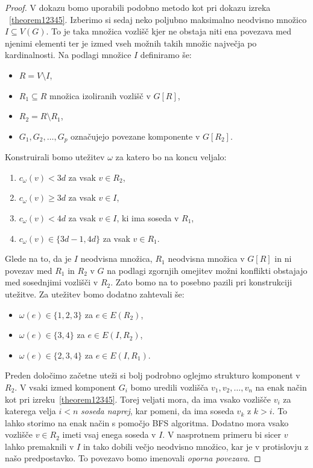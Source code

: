 \documentclass[12pt,a4paper,twoside]{article}
\theoremstyle{definition} %
\theoremstyle{plain} %
\numberwithin{equation}{section}  %
\begin{document}
\begin{proof}
V dokazu bomo uporabili podobno metodo kot pri dokazu izreka ~\ref{theorem12345}. Izberimo si sedaj neko poljubno maksimalno neodvisno množico $ I \subseteq V(G)$. To je taka množica vozlišč kjer ne obstaja niti ena povezava med njenimi elementi ter je izmed vseh možnih takih množic največja po kardinalnosti. Na podlagi množice $I$ definiramo še:
\begin{itemize}
\item $R = V \setminus I$,
\item $R_1 \subseteq R$ množica izoliranih vozlišč v $G[R]$,
\item $R_2 = R \setminus R_1$,
\item $G_1, G_2, \ldots, G_p$ označujejo povezane komponente v $G[R_2]$.
\end{itemize}
Konstruirali bomo utežitev $\omega$ za katero bo na koncu veljalo:
\begin{enumerate}
\item \label{itm:1} $c_{\omega}(v) < 3d $ za vsak $v \in R_2$,
\item \label{itm:2}$c_{\omega}(v) \ge 3d $ za vsak $v \in I$,
\item \label{itm:3}$c_{\omega}(v) < 4d $ za vsak $v \in I$, ki ima soseda v $R_1$,
\item \label{itm:4}$c_{\omega}(v) \in \{3d - 1, 4d\} $ za vsak $v \in R_1$.
\end{enumerate}
Glede na to, da je $I$ neodvisna množica, $R_1$ neodvisna množica v $G[R]$ in ni povezav med $R_1$ in $R_2$ v $G$ na podlagi zgornjih omejitev možni konflikti obstajajo med sosednjimi vozlišči v $R_2$. Zato bomo na to posebno pazili pri konstrukciji utežitve. Za utežitev bomo dodatno zahtevali še:
\begin{itemize}
\item $\omega(e) \in \{1,2,3\}$ za $e \in E(R_2)$,
\item $\omega(e) \in \{3,4\}$ za $e \in E(I, R_2)$,
\item $\omega(e) \in \{2,3,4\}$ za $e \in E(I, R_1)$.
\end{itemize}
Preden določimo začetne uteži si bolj podrobno oglejmo strukturo komponent v $R_2$. V vsaki izmed komponent $G_i$ bomo uredili vozlišča  $v_1, v_2, \ldots, v_n$ na enak način kot pri izreku~\ref{theorem12345}. Torej veljati mora, da ima vsako vozlišče $v_i$ za katerega velja $i < n$ \textit{soseda naprej}, kar pomeni, da ima soseda $v_k$ z $ k > i$. To lahko storimo na enak način s pomočjo BFS algoritma. Dodatno mora vsako vozlišče $v \in R_2$ imeti vsaj enega soseda v $I$. V nasprotnem primeru bi sicer $v$ lahko premaknili v $I$ in tako dobili večjo neodvisno množico, kar je v protislovju z našo predpostavko. To povezavo bomo imenovali \textit{oporna povezava}.

\end{proof}
\end{document}
